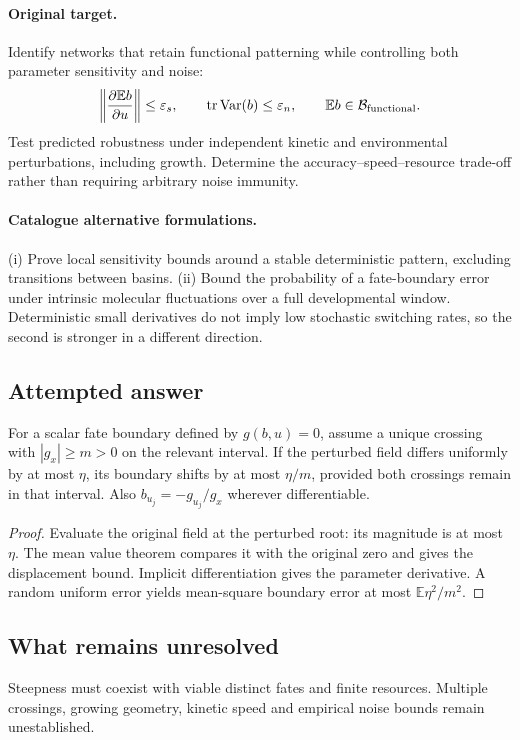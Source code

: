 \documentclass[11pt]{article}
\begin{document}
\paragraph{Original target.}
Identify networks that retain functional patterning while controlling both parameter sensitivity and noise:
\[
\left\|\frac{\partial\mathbb{E} b}{\partial u}\right\|\leq\varepsilon_s,
\qquad
\operatorname{tr}\operatorname{Var}(b)\leq\varepsilon_n,
\qquad
\mathbb{E} b\in\mathcal B_{\rm functional}.
\]
Test predicted robustness under independent kinetic and environmental perturbations, including growth. Determine the accuracy--speed--resource trade-off rather than requiring arbitrary noise immunity.
\paragraph{Catalogue alternative formulations.}
(i) Prove local sensitivity bounds around a stable deterministic pattern, excluding transitions between basins. (ii) Bound the probability of a fate-boundary error under intrinsic molecular fluctuations over a full developmental window. Deterministic small derivatives do not imply low stochastic switching rates, so the second is stronger in a different direction.
\subsection{Attempted answer}
\begin{proposition}
For a scalar fate boundary defined by $g(b,u)=0$, assume a unique crossing with $|g_x|\geq m>0$ on the relevant interval. If the perturbed field differs uniformly by at most $\eta$, its boundary shifts by at most $\eta/m$, provided both crossings remain in that interval. Also $b_{u_j}=-g_{u_j}/g_x$ wherever differentiable.
\end{proposition}
\begin{proof}
Evaluate the original field at the perturbed root: its magnitude is at most $\eta$. The mean value theorem compares it with the original zero and gives the displacement bound. Implicit differentiation gives the parameter derivative. A random uniform error yields mean-square boundary error at most $\mathbb{E}\eta^2/m^2$.
\end{proof}
\subsection{What remains unresolved}
Steepness must coexist with viable distinct fates and finite resources. Multiple crossings, growing geometry, kinetic speed and empirical noise bounds remain unestablished.
\end{document}
